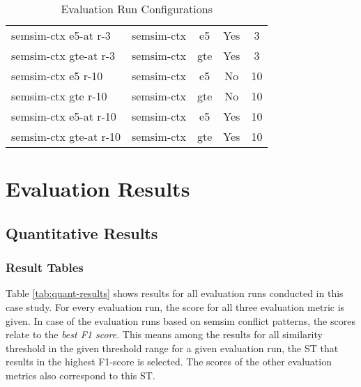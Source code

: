 \documentclass[11pt]{scrreprt}
\begin{document}
\begin{table}
\begin{tabular}{llccc}
semsim-ctx e5-at r-3             & semsim-ctx                   & e5                         & Yes                                       & 3 \\
semsim-ctx gte-at r-3            & semsim-ctx                   & gte                        & Yes                                       & 3 \\
semsim-ctx e5 r-10               & semsim-ctx                   & e5                         & No                                        & 10 \\
semsim-ctx gte r-10              & semsim-ctx                   & gte                        & No                                        & 10 \\
semsim-ctx e5-at r-10            & semsim-ctx                   & e5                         & Yes                                       & 10 \\
semsim-ctx gte-at r-10           & semsim-ctx                   & gte                        & Yes                                       & 10 \\
\bottomrule
\end{tabular}
\caption{Evaluation Run Configurations}
\label{tab:evaluation-run-configs}
\end{table}



\section{Evaluation Results}

\subsection{Quantitative Results}

\subsubsection{Result Tables}
Table \cref{tab:quant-results} shows results for all evaluation runs conducted in this case study. For every evaluation run, the score for all three evaluation metric is given. In case of the evaluation runs based on semsim conflict patterns, the scores relate to the \textit{best F1 score}. This means among the results for all similarity threshold in the given threshold range for a given evaluation run, the ST that results in the highest F1-score is selected. The scores of the other evaluation metrics also correspond to this ST.
\end{document}
